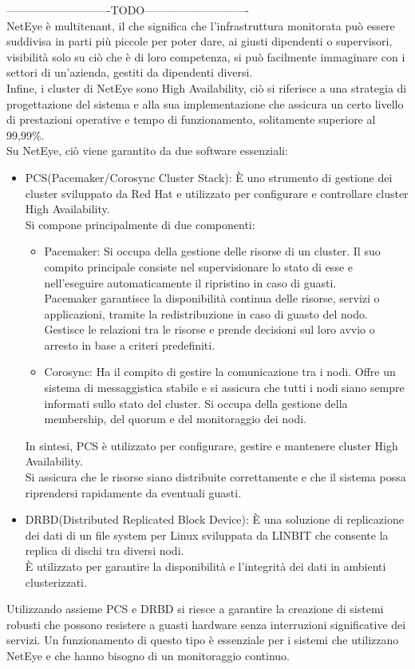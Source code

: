 ----------------------------TODO----------------------------\\ NetEye è multitenant,
il che significa che l'infrastruttura monitorata può essere suddivisa in parti
più piccole per poter dare, ai giusti dipendenti o supervisori, visibilità solo
su ciò che è di loro competenza, si può facilmente immaginare con i settori di un'azienda,
gestiti da dipendenti diversi.\\ Infine, i cluster di NetEye sono High Availability,
ciò si riferisce a una strategia di progettazione del sistema e alla sua
implementazione che assicura un certo livello di prestazioni operative e tempo
di funzionamento, solitamente superiore al 99,99\%.\\ Su NetEye, ciò viene garantito
da due software essenziali:
\begin{itemize}
  \item PCS(Pacemaker/Corosync Cluster Stack): È uno strumento di gestione dei cluster
    sviluppato da Red Hat e utilizzato per configurare e controllare cluster High
    Availability.\\ Si compone principalmente di due componenti:
    \begin{itemize}
      \item Pacemaker: Si occupa della gestione delle risorse di un cluster. Il suo
        compito principale consiste nel supervisionare lo stato di esse e nell'eseguire
        automaticamente il ripristino in caso di guasti.\\ Pacemaker garantisce la
        disponibilità continua delle risorse, servizi o applicazioni, tramite la
        redistribuzione in caso di guasto del nodo. Gestisce le relazioni tra le
        risorse e prende decisioni sul loro avvio o arresto in base a criteri
        predefiniti.

      \item Corosync: Ha il compito di gestire la comunicazione tra i nodi. Offre
        un sistema di messaggistica stabile e si assicura che tutti i nodi siano
        sempre informati sullo stato del cluster. Si occupa della gestione della
        membership, del quorum e del monitoraggio dei nodi.
    \end{itemize}
    In sintesi, PCS è utilizzato per configurare, gestire e mantenere cluster
    High Availability.\\ Si assicura che le risorse siano distribuite
    correttamente e che il sistema possa riprendersi rapidamente da eventuali
    guasti.

  \item DRBD(Distributed Replicated Block Device): È una soluzione di replicazione
    dei dati di un file system per Linux sviluppata da LINBIT che consente la replica
    di dischi tra diversi nodi.\\ È utilizzato per garantire la disponibilità e l'integrità
    dei dati in ambienti clusterizzati.
\end{itemize}
Utilizzando assieme PCS e DRBD si riesce a garantire la creazione di sistemi
robusti che possono resistere a guasti hardware senza interruzioni significative
dei servizi. Un funzionamento di questo tipo è essenziale per i sistemi che utilizzano
NetEye e che hanno bisogno di un monitoraggio continuo.
